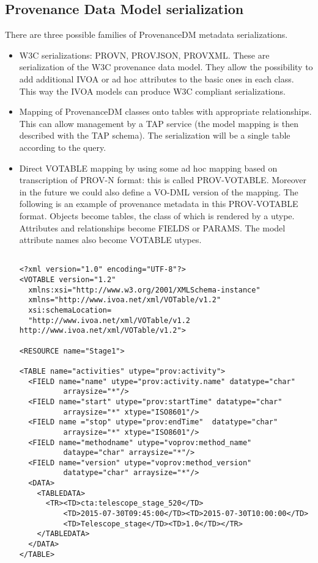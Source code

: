 \subsection{Provenance Data Model serialization}
There are three possible families of ProvenanceDM metadata serializations.
\begin{itemize}
 \item W3C serializations: PROV\-N, PROV\-JSON, PROV\-XML. These are serialization of the W3C provenance data model. They allow the possibility to add additional IVOA or ad hoc attributes to the basic ones in each class. This way the IVOA models can produce W3C compliant serializations.
 \item Mapping of ProvenanceDM classes onto tables with appropriate relationships. This can allow management by a TAP service (the model mapping is then described with the TAP schema). The serialization will be a single table according to the query.


 \item Direct VOTABLE mapping by using some ad hoc mapping based on transcription of PROV-N format: this is called PROV-VOTABLE. Moreover in the future we could also define a VO-DML \citep{std:VODML} version of the mapping.
The following is an example of provenance metadata in this PROV-VOTABLE format. Objects become tables, the class of which is rendered by a utype. Attributes and relationships become FIELDS or PARAMS. The model attribute names also become VOTABLE utypes.  
\begin{verbatim}

<?xml version="1.0" encoding="UTF-8"?>
<VOTABLE version="1.2" 
  xmlns:xsi="http://www.w3.org/2001/XMLSchema-instance"
  xmlns="http://www.ivoa.net/xml/VOTable/v1.2"
  xsi:schemaLocation=
  "http://www.ivoa.net/xml/VOTable/v1.2 http://www.ivoa.net/xml/VOTable/v1.2">

<RESOURCE name="Stage1">

<TABLE name="activities" utype="prov:activity">
  <FIELD name="name" utype="prov:activity.name" datatype="char" 
          arraysize="*"/>
  <FIELD name="start" utype="prov:startTime" datatype="char" 
          arraysize="*" xtype="ISO8601"/>
  <FIELD name ="stop" utype="prov:endTime"  datatype="char" 
          arraysize="*" xtype="ISO8601"/>
  <FIELD name="methodname" utype="voprov:method_name" 
          dataype="char" arraysize="*"/>
  <FIELD name="version" utype="voprov:method_version" 
          datatype="char" arraysize="*"/>  
  <DATA>
    <TABLEDATA>
      <TR><TD>cta:telescope_stage_520</TD>
          <TD>2015-07-30T09:45:00</TD><TD>2015-07-30T10:00:00</TD>
          <TD>Telescope_stage</TD><TD>1.0</TD></TR>
    </TABLEDATA>
  </DATA>      
</TABLE>


\end{verbatim}
\end{itemize}
